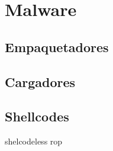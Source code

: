 \section{Malware}

\subsection{Empaquetadores}

\subsection{Cargadores}

\subsection{Shellcodes}

shelcodeless rop

